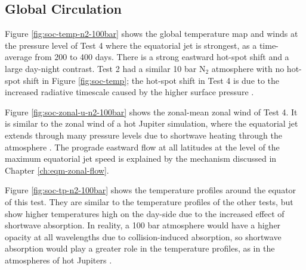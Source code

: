 

\subsection{Global Circulation}

 Figure \ref{fig:soc-temp-n2-100bar} shows the global temperature map and winds at the pressure level of Test 4 where the equatorial jet is strongest,  as a time-average from 200 to 400 days. There is a strong eastward hot-spot shift and a large day-night contrast. Test 2 had a similar 10 bar N$_{2}$ atmosphere with no hot-spot shift in Figure \ref{fig:soc-temp}; the hot-spot shift in Test 4 is due to the increased radiative timescale caused by the higher surface pressure \citep{zhang2017dynamics}.

Figure \ref{fig:soc-zonal-u-n2-100bar} shows the zonal-mean zonal wind of Test 4. It is similar to the zonal wind of a hot Jupiter simulation, where the equatorial jet extends through many pressure levels due to shortwave heating through the atmosphere \citep{showman2015circulation}. The prograde eastward flow at all latitudes at the level of the maximum equatorial jet speed is explained by the mechanism discussed in Chapter \ref{ch:eqm-zonal-flow}.

Figure \ref{fig:soc-tp-n2-100bar} shows the temperature profiles around the equator of this test. They are similar to the temperature profiles of the other tests, but show higher temperatures high on the day-side due to the increased effect of shortwave absorption. In reality, a 100 bar atmosphere would have a higher opacity at all wavelengths due to collision-induced absorption, so shortwave absorption would play a greater role in the temperature profiles, as in the atmospheres of hot Jupiters \citep{amundsen2016hd209}.



